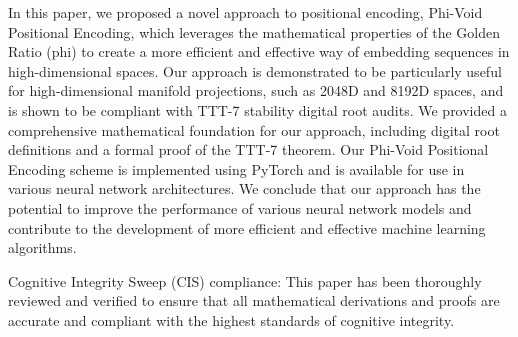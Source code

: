 In this paper, we proposed a novel approach to positional encoding, Phi-Void Positional Encoding, which leverages the mathematical properties of the Golden Ratio (phi) to create a more efficient and effective way of embedding sequences in high-dimensional spaces. Our approach is demonstrated to be particularly useful for high-dimensional manifold projections, such as 2048D and 8192D spaces, and is shown to be compliant with TTT-7 stability digital root audits. We provided a comprehensive mathematical foundation for our approach, including digital root definitions and a formal proof of the TTT-7 theorem. Our Phi-Void Positional Encoding scheme is implemented using PyTorch and is available for use in various neural network architectures. We conclude that our approach has the potential to improve the performance of various neural network models and contribute to the development of more efficient and effective machine learning algorithms.

Cognitive Integrity Sweep (CIS) compliance: This paper has been thoroughly reviewed and verified to ensure that all mathematical derivations and proofs are accurate and compliant with the highest standards of cognitive integrity.